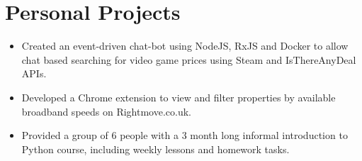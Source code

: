 \section{Personal Projects}\label{sec:personal-projects}

\begin{itemize}
	\setlength\itemsep{0em}
	\item Created an event-driven chat-bot using NodeJS, RxJS and Docker to allow chat based searching for video game prices using Steam and IsThereAnyDeal APIs.
	\item Developed a Chrome extension to view and filter properties by available broadband speeds on Rightmove.co.uk.
	\item Provided a group of 6 people with a 3 month long informal introduction to Python course, including weekly lessons and homework tasks. 
\end{itemize}